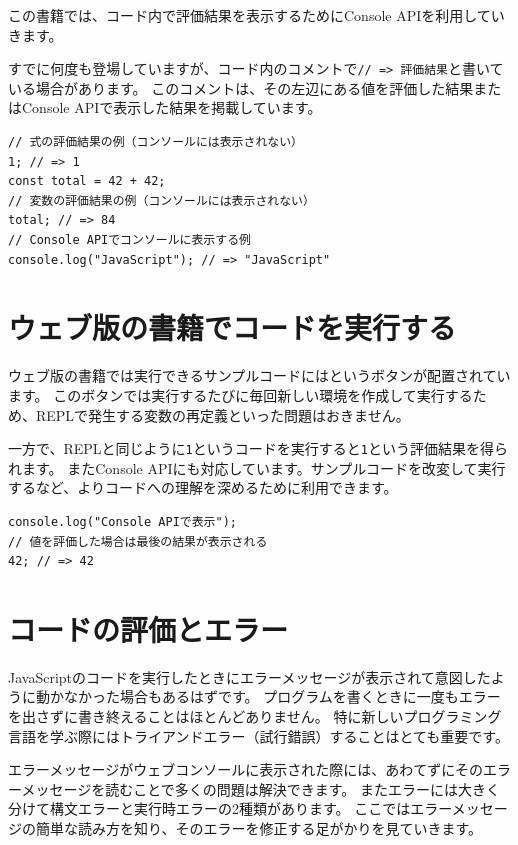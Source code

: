 この書籍では、コード内で評価結果を表示するためにConsole
APIを利用していきます。

すでに何度も登場していますが、コード内のコメントで\texttt{// => 評価結果}と書いている場合があります。
このコメントは、その左辺にある値を評価した結果またはConsole
APIで表示した結果を掲載しています。

\begin{lstlisting}
// 式の評価結果の例（コンソールには表示されない）
1; // => 1
const total = 42 + 42;
// 変数の評価結果の例（コンソールには表示されない）
total; // => 84
// Console APIでコンソールに表示する例
console.log("JavaScript"); // => "JavaScript"
\end{lstlisting}

\hypertarget{execute-on-web}{%
\section{ウェブ版の書籍でコードを実行する}\label{execute-on-web}}

ウェブ版の書籍では実行できるサンプルコードには\textbf{}というボタンが配置されています。
このボタンでは実行するたびに毎回新しい環境を作成して実行するため、REPLで発生する変数の再定義といった問題はおきません。

一方で、REPLと同じように\texttt{1}というコードを実行すると\texttt{1}という評価結果を得られます。
またConsole
APIにも対応しています。サンプルコードを改変して実行するなど、よりコードへの理解を深めるために利用できます。

\begin{lstlisting}
console.log("Console APIで表示");
// 値を評価した場合は最後の結果が表示される
42; // => 42
\end{lstlisting}

\hypertarget{eval-code-and-error}{%
\section{コードの評価とエラー}\label{eval-code-and-error}}

JavaScriptのコードを実行したときにエラーメッセージが表示されて意図したように動かなかった場合もあるはずです。
プログラムを書くときに一度もエラーを出さずに書き終えることはほとんどありません。
特に新しいプログラミング言語を学ぶ際にはトライアンドエラー（試行錯誤）することはとても重要です。

エラーメッセージがウェブコンソールに表示された際には、あわてずにそのエラーメッセージを読むことで多くの問題は解決できます。
またエラーには大きく分けて構文エラーと実行時エラーの2種類があります。
ここではエラーメッセージの簡単な読み方を知り、そのエラーを修正する足がかりを見ていきます。

